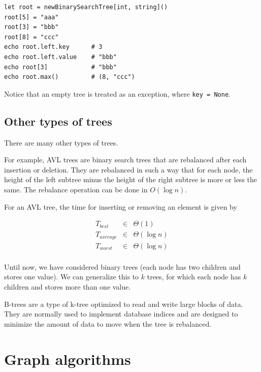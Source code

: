 \documentclass[justified, sixbynine]{tufte-book}
\def\ft{\small\tt}
\theoremstyle{plain}%
\newtheorem * {corollary}{Corollary}
\theoremstyle{definition}
\theoremstyle{remark}
\newtheorem * {remark}{Remark}
\newtheorem * {note}{Note}
\begin{document}
\begin{fullwidth}
\begin{lstlisting}
let root = newBinarySearchTree[int, string]()
root[5] = "aaa"
root[3] = "bbb"
root[8] = "ccc"
echo root.left.key      # 3
echo root.left.value    # "bbb"
echo root[3]            # "bbb"
echo root.max()         # (8, "ccc")
\end{lstlisting}

Notice that an empty tree is treated as an exception, where {\ft key = None}.

\goodbreak\subsection{Other types of trees}

There are many other types of trees. 

For example, AVL trees are binary search trees that are rebalanced after each
insertion or deletion. They are rebalanced in such a way that for each node, the
height of the left subtree minus the height of the right subtree is more or less the same. The rebalance operation can be done in $O(\log n)$.

For an AVL tree, the time for inserting or removing an element is given by

\begin{eqnarray}
T_{best} &\in &\Theta (1) \\
T_{average} &\in &\Theta (\log n) \\
T_{worst} &\in &\Theta (\log n) \\
\end{eqnarray}


Until now, we have considered binary trees (each node has two children and
stores one value). We can generalize this to $k$ trees, for which each node has $k$
children and stores more than one value.

B-trees are a type of k-tree optimized to read and write large blocks of data. They are normally used to implement database indices and are designed to minimize the amount of data to move when the tree is rebalanced.

\goodbreak\section{Graph algorithms}



\end{fullwidth}
\end{document}
